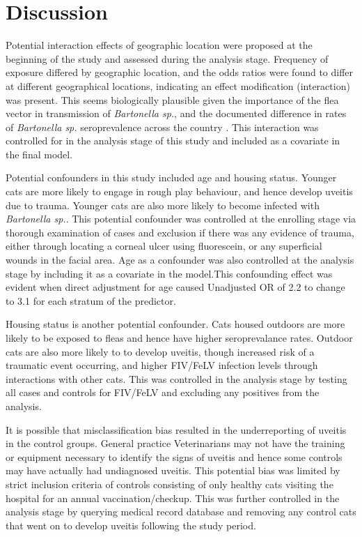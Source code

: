 \documentclass[11pt,twocolumn]{article}
\begin{document}
\section{Discussion}
		Potential interaction effects of geographic location were proposed at the beginning of the study and assessed during the analysis stage.
		Frequency of exposure differed by geographic location, and the odds ratios were found to differ at different geographical locations, indicating an effect modification (interaction) was present.
		This seems biologically plausible given the importance of the flea vector in transmission of \emph{Bartonella sp.}, and the documented difference in rates of \emph{Bartonella sp.} seroprevalence across the country \cite{Jameson1995a}.
		This interaction was controlled for in the analysis stage of this study and included as a covariate in the final model.

		Potential confounders in this study included age and housing status. 
		Younger cats are more likely to engage in rough play behaviour, and hence develop uveitis due to trauma. Younger cats are also more likely to become infected with \emph{Bartonella sp.}\cite{Brunt2006}.
		This potential confounder was controlled at the enrolling stage via thorough examination of cases and exclusion if there was any evidence of trauma, either through locating a corneal ulcer using fluorescein, or any superficial wounds in the facial area.
		Age as a confounder was also controlled at the analysis stage by including it as a covariate in the model.This confounding effect was evident when direct adjustment for age caused Unadjusted OR of 2.2 to change to 3.1 for each stratum of the predictor.

		
		Housing status is another potential confounder. Cats housed outdoors are more likely to be exposed to fleas and hence have higher seroprevalance rates.
		Outdoor cats are also more likely to to develop uveitis, though increased risk of a traumatic event occurring, and higher FIV/FeLV infection levels through interactions with other cats.
		This was controlled in the analysis stage by testing all cases and controls for FIV/FeLV and excluding any positives from the analysis.


		It is possible that misclassification bias resulted in the underreporting of uveitis in the control groups. General practice Veterinarians may not have the training or equipment necessary to identify the signs of uveitis and hence some controls may have actually had undiagnosed uveitis.
		This potential bias was limited by strict inclusion criteria of controls consisting of only healthy cats visiting the hospital for an annual vaccination/checkup. 
		This was further controlled in the analysis stage by querying medical record database and removing any control cats that went on to develop uveitis following the study period.
\end{document}
